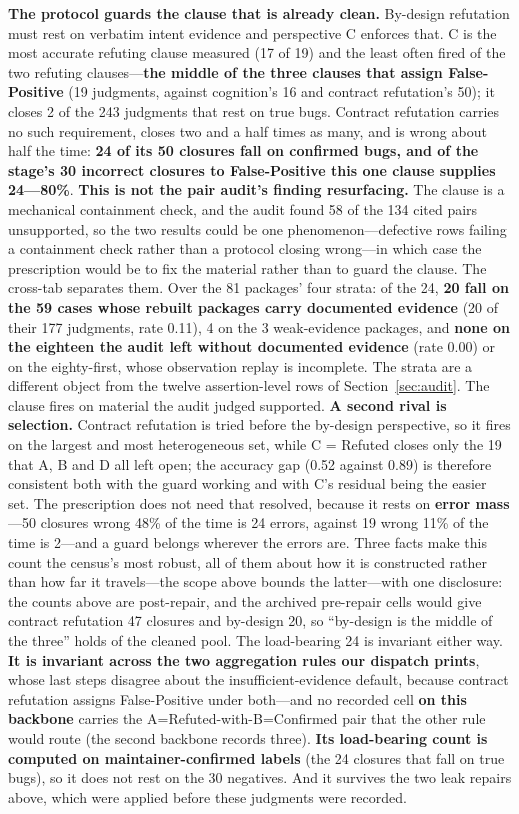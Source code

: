 \documentclass[acmsmall,screen,review,anonymous]{acmart}
\begin{document}
\textbf{The protocol guards the clause that is already clean.} By-design refutation must rest on
verbatim intent evidence and perspective C enforces that. C is the most accurate refuting clause
measured (17 of 19) and the least often fired of the two refuting clauses---\textbf{the middle of
the three clauses that assign False-Positive} (19 judgments, against cognition's 16 and contract
refutation's 50); it closes 2 of the 243 judgments that rest on true bugs. Contract refutation
carries no such requirement, closes two and a half times as many, and is wrong about half the time:
\textbf{24 of its 50 closures fall on confirmed bugs, and of the stage's 30 incorrect closures to
False-Positive this one clause supplies 24---80\%}. \textbf{This is not the pair audit's finding
resurfacing.} The clause is a mechanical containment check, and the audit found 58 of the 134 cited
pairs unsupported, so the two results could be one phenomenon---defective rows failing a containment
check rather than a protocol closing wrong---in which case the prescription would be to fix the
material rather than to guard the clause. The cross-tab separates them. Over the 81 packages' four
strata: of the 24, \textbf{20 fall on the 59 cases whose rebuilt packages carry documented evidence}
(20 of their 177 judgments, rate 0.11), 4 on the 3 weak-evidence packages, and \textbf{none on the
eighteen the audit left without documented evidence} (rate 0.00) or on the eighty-first, whose
observation replay is incomplete. The strata are a different object from the twelve assertion-level
rows of Section~\ref{sec:audit}. The clause fires on material the audit judged
supported. \textbf{A second rival is selection.} Contract refutation is tried before the by-design
perspective, so it fires on the largest and most heterogeneous set, while C = Refuted closes only
the 19 that A, B and D all left open; the accuracy gap (0.52 against 0.89) is therefore consistent
both with the guard working and with C's residual being the easier set. The prescription does not
need that resolved, because it rests on \textbf{error mass}---50 closures wrong 48\% of the time is
24 errors, against 19 wrong 11\% of the time is 2---and a guard belongs wherever the errors are.
Three facts make this count the census's most
robust, all of them about how it is constructed rather than how far it travels---the scope above
bounds the latter---with one disclosure: the counts above are post-repair, and the archived
pre-repair cells would give contract refutation 47 closures and by-design 20, so ``by-design is the
middle of the three'' holds of the cleaned pool. The load-bearing 24 is invariant either way.
\textbf{It is invariant across the two aggregation rules our dispatch prints}, whose last steps
disagree about the insufficient-evidence default, because contract refutation assigns
False-Positive under both---and no recorded cell \textbf{on this backbone} carries the
A=Refuted-with-B=Confirmed pair that the other rule would route (the second backbone records three).
\textbf{Its load-bearing count is computed on maintainer-confirmed labels} (the 24 closures that
fall on true bugs), so it does not rest on the 30 negatives. And it
survives the two leak repairs above, which were applied before these judgments were recorded.
\end{document}
